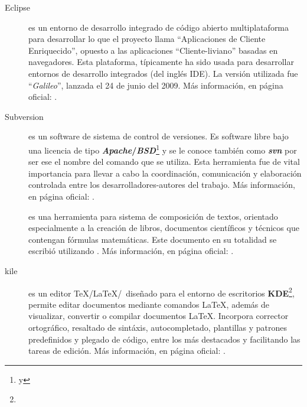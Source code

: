 \begin{description}
\item [Eclipse] es un entorno de desarrollo integrado de código abierto multiplataforma para desarrollar lo que el proyecto llama ``Aplicaciones de Cliente Enriquecido'', opuesto a las aplicaciones ``Cliente-liviano'' basadas en navegadores. Esta plataforma, típicamente ha sido usada para desarrollar entornos de desarrollo integrados (del inglés IDE). La versión utilizada fue ``\textit{Galileo}'', lanzada el 24 de junio del 2009. Más información, en página oficial: .

\item [Subversion] es un software de sistema de control de versiones. Es software libre bajo una licencia de tipo \textbf{\textit{Apache}/\textit{BSD}}\footnote{ y } y se le conoce también como \textit{\textbf{svn}} por ser ese el nombre del comando que se utiliza. Esta herramienta fue de vital importancia para llevar a cabo la coordinación, comunicación y elaboración controlada entre los desarrolladores-autores del trabajo. Más información, en página oficial: .

\item [\LaTeXe] es una herramienta para sistema de composición de textos, orientado especialmente a la creación de libros, documentos científicos y técnicos que contengan fórmulas matemáticas. Este documento en su totalidad se escribió utilizando \LaTeXe\cite{latex}. Más información, en página oficial: .

\item [kile] es un editor \TeX/\LaTeX/\LaTeXe\ diseñado para el entorno de escritorios \textbf{KDE}\footnote{}, permite editar documentos mediante comandos \LaTeX, además de visualizar, convertir o compilar documentos \LaTeX. Incorpora corrector ortográfico, resaltado de sintáxis, autocompletado, plantillas y patrones predefinidos y plegado de código, entre los más destacados y facilitando las tareas de edición. Más información, en página oficial: .


\end{description}
